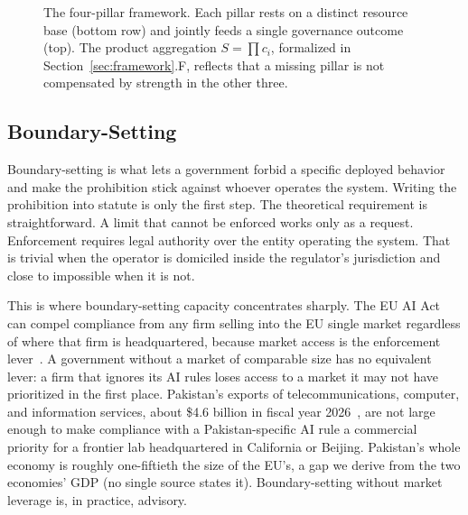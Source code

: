 \documentclass{ieeeaccess}
\begin{document}
\begin{figure}[H]
{%
}
\caption{The four-pillar framework. Each pillar rests on a distinct resource base (bottom row) and jointly feeds a single governance outcome (top). The product aggregation $S=\prod c_i$, formalized in Section~\ref{sec:framework}.F, reflects that a missing pillar is not compensated by strength in the other three.}
\label{fig:pillars}
\end{figure}

\subsection{Boundary-Setting}

Boundary-setting is what lets a government forbid a specific deployed behavior and make the prohibition stick against whoever operates the system. Writing the prohibition into statute is only the first step. The theoretical requirement is straightforward. A limit that cannot be enforced works only as a request. Enforcement requires legal authority over the entity operating the system. That is trivial when the operator is domiciled inside the regulator's jurisdiction and close to impossible when it is not.

This is where boundary-setting capacity concentrates sharply. The EU AI Act can compel compliance from any firm selling into the EU single market regardless of where that firm is headquartered, because market access is the enforcement lever~\cite{euaiact2024}.
A government without a market of comparable size has no equivalent lever: a firm that ignores its AI rules loses access to a market it may not have prioritized in the first place. Pakistan's exports of telecommunications, computer, and information services, about \$4.6 billion in fiscal year 2026~\cite{sbp2026itexports},
are not large enough to make compliance with a Pakistan-specific AI rule a commercial priority for a frontier lab headquartered in California or Beijing. Pakistan's whole economy is roughly one-fiftieth the size of the EU's, a gap we derive from the two economies' GDP (no single source states it). Boundary-setting without market leverage is, in practice, advisory.
\end{document}
